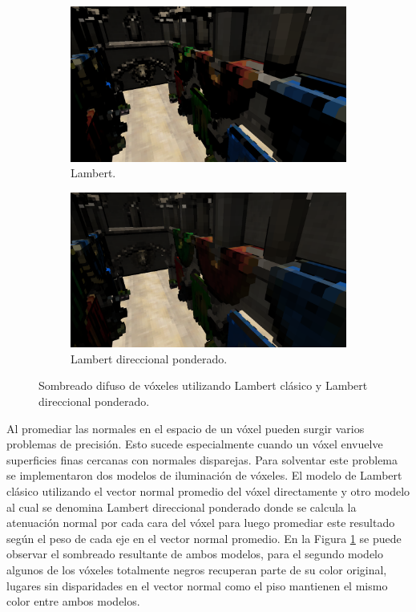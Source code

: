 \begin{figure}[H]
	\centering
	\begin{subfigure}[t]{0.49\textwidth}
		\centering
		\captionsetup{justification=centering}
		\includegraphics[width=\linewidth]{media/classic_lambert.png}
		\caption*{Lambert.}
	\end{subfigure}%
	\hspace{0.01\textwidth}
	\begin{subfigure}[t]{0.49\textwidth}
		\centering
		\captionsetup{justification=centering}
		\includegraphics[width=\linewidth]{media/dir_lambert.png}
		\caption*{Lambert direccional ponderado.}
	\end{subfigure}%
	\caption{Sombreado difuso de vóxeles utilizando Lambert clásico y Lambert direccional ponderado.}
	\label{fig:lambert_dir_diff}
\end{figure}

Al promediar las normales en el espacio de un vóxel pueden surgir varios problemas de precisión. Esto sucede especialmente cuando un vóxel envuelve superficies finas cercanas con normales disparejas. Para solventar este problema se implementaron dos modelos de iluminación de vóxeles. El modelo de Lambert clásico utilizando el vector normal promedio del vóxel directamente y otro modelo al cual se denomina Lambert direccional ponderado donde se calcula la atenuación normal por cada cara del vóxel para luego promediar este resultado según el peso de cada eje en el vector normal promedio. En la Figura \ref{fig:lambert_dir_diff} se puede observar el sombreado resultante de ambos modelos, para el segundo modelo algunos de los vóxeles totalmente negros recuperan parte de su color original, lugares sin disparidades en el vector normal como el piso mantienen el mismo color entre ambos modelos.

